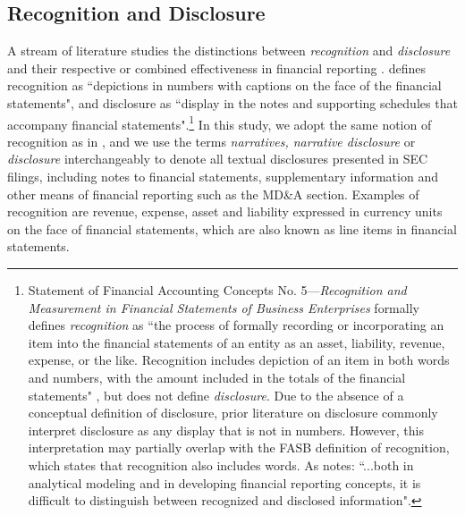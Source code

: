 \documentclass[a4paper]{article}
\begin{document}
\begin{spacing}{2}
\subsection{Recognition and Disclosure}
A stream of literature studies the distinctions between \textit{recognition} and \textit{disclosure} and their respective or combined effectiveness in financial reporting .  defines recognition as ``depictions in numbers with captions on the face of the financial statements", and disclosure as ``display in the notes and supporting schedules that accompany financial statements".\footnote{Statement of Financial Accounting Concepts No. 5---\textit{Recognition and Measurement in Financial Statements of Business Enterprises} formally defines \textit{recognition} as ``the process of formally recording or incorporating an item into the financial statements of an entity as an asset, liability, revenue, expense, or the like. Recognition includes depiction of an item in both words and numbers, with the amount included in the totals of the financial statements" , but does not define \textit{disclosure}. Due to the absence of a conceptual definition of disclosure, prior literature on disclosure commonly interpret disclosure as any display that is not in numbers. However, this interpretation may partially overlap with the FASB definition of recognition, which states that recognition also includes words. As  notes: ``...both in analytical modeling and in developing financial reporting concepts, it is difficult to distinguish between recognized and disclosed information".} In this study, we adopt the same notion of recognition as in \cite{schipperRequiredDisclosuresFinancial2007}, and we use the terms \textit{narratives, narrative disclosure} or \textit{disclosure} interchangeably to denote all textual disclosures presented in SEC filings, including notes to financial statements, supplementary information and other means of financial reporting such as the MD\&A section. Examples of recognition are revenue, expense, asset and liability expressed in currency units on the face of financial statements, which are also known as line items in financial statements. 


\end{spacing}
\end{document}
